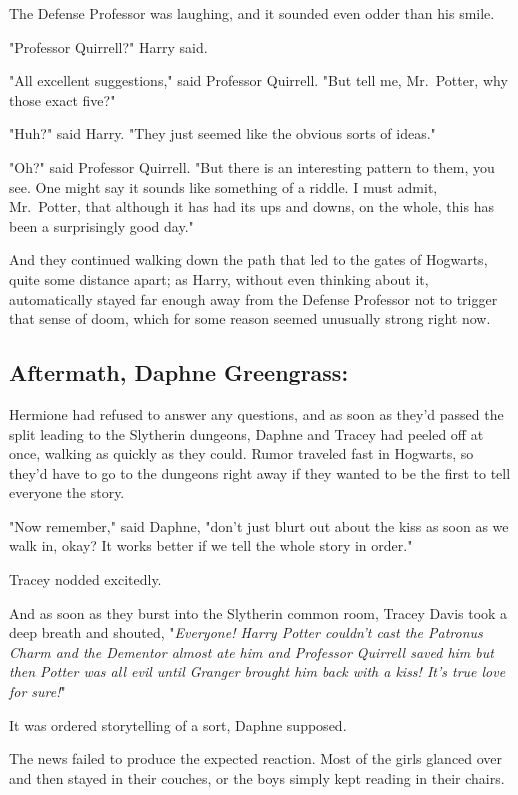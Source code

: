 The Defense Professor was laughing, and it sounded even odder than his smile.

"Professor Quirrell?" Harry said.

"All excellent suggestions," said Professor Quirrell. "But tell me, Mr.~Potter, 
why those exact five?"

"Huh?" said Harry. "They just seemed like the obvious sorts of ideas."

"Oh?" said Professor Quirrell. "But there is an interesting pattern to them, 
you see. One might say it sounds like something of a riddle. I must admit, 
Mr.~Potter, that although it has had its ups and downs, on the whole, this has 
been a surprisingly good day."

And they continued walking down the path that led to the gates of Hogwarts, 
quite some distance apart; as Harry, without even thinking about it, 
automatically stayed far enough away from the Defense Professor not to trigger 
that sense of doom, which for some reason seemed unusually strong right now.
\sbreak
\vspace{-2\baselineskip}
\subsection{Aftermath, Daphne Greengrass:}

Hermione had refused to answer any questions, and as soon as they'd passed the 
split leading to the Slytherin dungeons, Daphne and Tracey had peeled off at 
once, walking as quickly as they could. Rumor traveled fast in Hogwarts, so 
they'd have to go to the dungeons right away if they wanted to be the first to 
tell everyone the story.

"Now remember," said Daphne, "don't just blurt out about the kiss as soon as we 
walk in, okay? It works better if we tell the whole story in order."

Tracey nodded excitedly.

And as soon as they burst into the Slytherin common room, Tracey Davis took a 
deep breath and shouted, "\emph{Everyone! Harry Potter couldn't cast the 
Patronus Charm and the Dementor almost ate him and Professor Quirrell saved him 
but then Potter was all evil until Granger brought him back with a kiss! It's 
true love for sure!}"

It was ordered storytelling of a sort, Daphne supposed.

The news failed to produce the expected reaction. Most of the girls glanced 
over and then stayed in their couches, or the boys simply kept reading in their 
chairs.

